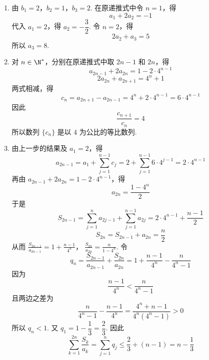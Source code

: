 \begin{solution}
\begin{enumerate}
\item 由 \(b_1=2\)，\(b_2=1\)，\(b_3=2\).
在原递推式中令 \(n=1\)，得
\[
a_1+2a_2=-1
\]
代入 \(a_1=2\)，得 \(a_2=-\dfrac32\). 令 \(n=2\)，得
\[
2a_2+a_3=5
\]
所以 \(a_3=8\).

\item 对 \(n\in\N^*\)，分别在原递推式中取 \(2n-1\) 和 \(2n\)，得
\[
a_{2n-1}+2a_{2n}=1-2\cdot4^{n-1}
\]
\[
2a_{2n}+a_{2n+1}=4^n+1
\]
两式相减，得
\[
c_n=a_{2n+1}-a_{2n-1}
=4^n+2\cdot4^{n-1}
=6\cdot4^{n-1}
\]
因此
\[
\frac{c_{n+1}}{c_n}=4
\]
所以数列 \(\{c_n\}\) 是以 \(4\) 为公比的等比数列.

\item 由上一步的结果及 \(a_1=2\)，得
\[
a_{2n-1}=a_1+\sum_{j=1}^{n-1}c_j
=2+\sum_{j=1}^{n-1}6\cdot4^{j-1}
=2\cdot4^{n-1}
\]
再由 \(a_{2n-1}+2a_{2n}=1-2\cdot4^{n-1}\)，得
\[
a_{2n}=\frac{1-4^n}{2}
\]
于是
\[
S_{2n-1}=\sum_{j=1}^{n}a_{2j-1}+\sum_{j=1}^{n-1}a_{2j}
=2\cdot4^{n-1}+\frac{n-1}{2}
\]
\[
S_{2n}=S_{2n-1}+a_{2n}=\frac n2
\]
从而 \(\frac{S_{2n-1}}{a_{2n-1}}=1+\frac{n-1}{4^n}\)，
\(\frac{S_{2n}}{a_{2n}}=\frac{n}{1-4^n}\).
令
\[
q_n=\frac{S_{2n-1}}{a_{2n-1}}+\frac{S_{2n}}{a_{2n}}
=1+\frac{n-1}{4^n}-\frac{n}{4^n-1}
\]
因为
\[
\frac{n-1}{4^n}<\frac{n}{4^n-1}
\]
且两边之差为
\[
\frac{n}{4^n-1}-\frac{n-1}{4^n}
=\frac{4^n+n-1}{4^n(4^n-1)}>0
\]
所以 \(q_n<1\). 又 \(q_1=1-\dfrac13=\dfrac23\). 因此
\[
\sum_{k=1}^{2n}\frac{S_k}{a_k}
=\sum_{j=1}^{n}q_j
\leqslant\frac23+(n-1)
=n-\frac13
\]
\end{enumerate}
\end{solution}
